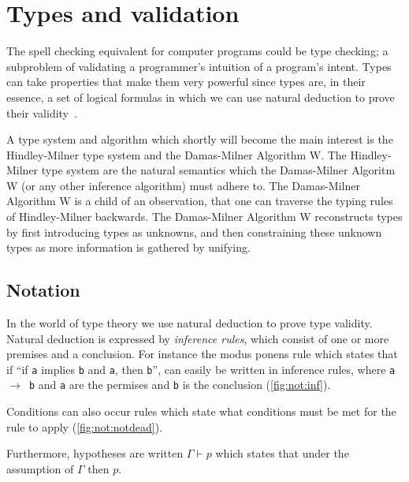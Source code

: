 \documentclass[11pt,oneside,a4paper]{report}
\begin{document}
\section{Types and validation}
\label{sec:types}
The spell checking equivalent for computer programs could be type checking; a subproblem of validating a programmer's intuition of a program's intent.
Types can take properties that make them very powerful since types are, in their essence, a set of logical formulas in which we can use natural deduction to prove their validity~\cite{howard1980formulae}.

A type system and algorithm which shortly will become the main interest is the Hindley-Milner type system and the Damas-Milner Algorithm W.
The Hindley-Milner type system are the natural semantics which the Damas-Milner Algoritm W (or any other inference algorithm) must adhere to.
The Damas-Milner Algorithm W is a child of an observation, that one can traverse the typing rules of Hindley-Milner backwards.
The Damas-Milner Algorithm W reconstructs types by first introducing types as unknowns, and then constraining these unknown types as more information is gathered by unifying.
\subsection{Notation}
In the world of type theory we use natural deduction to prove type validity.
Natural deduction is expressed by \textit{inference rules}, which consist of one or more premises and a conclusion.
For instance the modus ponens rule which states that if ``if \texttt{a} implies \texttt{b} and \texttt{a}, then \texttt{b}'', can easily be written in inference rules, where \texttt{a $\rightarrow$ b} and \texttt{a} are the permises and \texttt{b} is the conclusion (\autoref{fig:not:inf}).
\begin{figure}
  \begin{mdframed}
  \begin{prooftree}
  \end{prooftree}
  \end{mdframed}
  \caption{}
  \label{fig:not:inf}
\end{figure}
Conditions can also occur rules which state what conditions must be met for the rule to apply (\autoref{fig:not:notdead}).
\begin{figure}
  \begin{mdframed}
  \begin{prooftree}
  \end{prooftree}
  \end{mdframed}
  \caption{}
  \label{fig:not:notdead}
\end{figure}
Furthermore, hypotheses are written $\Gamma \vdash p$ which states that under the assumption of $\Gamma$ then $p$.
\end{document}
